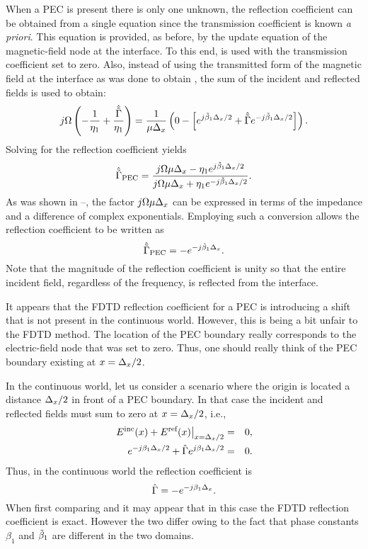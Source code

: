 When a PEC is present there is only one unknown, the reflection
coefficient can be obtained from a single equation since the
transmission coefficient is known {\em a priori}.  This equation is
provided, as before, by the update equation of the magnetic-field node
at the interface.  To this end,  is used with
the transmission coefficient set to zero.  Also, instead of using the
transmitted form of the magnetic field at the interface as was done to
obtain , the sum of the incident and reflected
fields is used to obtain:
\begin{equation}
  j\Omega \left(-\frac{1}{\eta_1}+\frac{\hat{\tilde{\Gamma}}}{\eta_1}\right) =
  \frac{1}{\mu\Delta_x}
     \left(0 - 
           \left[e^{j\tilde{\beta}_1\Delta_x/2} + \hat{\tilde{\Gamma}} e^{-j\tilde{\beta}_1\Delta_x/2}\right]\right).
\end{equation}
Solving for the reflection coefficient yields
\begin{equation}
  \hat{\tilde{\Gamma}}_{\mbox{\scriptsize PEC}} = 
  \frac{j\Omega\mu\Delta_x - \eta_1 e^{j\tilde{\beta}_1\Delta_x/2}}
       {j\Omega\mu\Delta_x + \eta_1 e^{-j\tilde{\beta}_1\Delta_x/2}}.
\end{equation}
As was shown in
--, the factor
$j\Omega\mu\Delta_x$ can be expressed in terms of the impedance and a
difference of complex exponentials.  Employing such a conversion
allows the reflection coefficient to be written as
\begin{equation}
  \hat{\tilde{\Gamma}}_{\mbox{\scriptsize PEC}} = -e^{-j\tilde{\beta}_1\Delta_x}.
  \label{eq:fdtdRefPEC}
\end{equation}
Note that the magnitude of the reflection coefficient is unity so that
the entire incident field, regardless of the frequency, is reflected from
the interface.

It appears that the FDTD reflection coefficient for a PEC is
introducing a shift that is not present in the continuous world.
However, this is being a bit unfair to the FDTD method.  The location
of the PEC boundary really corresponds to the electric-field node
that was set to zero.  Thus, one should really think of the PEC
boundary existing at $x=\Delta_x/2$.

In the continuous world, let us consider a scenario where the origin
is located a distance $\Delta_x/2$ in front of a PEC boundary.  In that
case the incident and reflected fields must sum to zero at
$x=\Delta_x/2$, i.e.,
\begin{eqnarray}
  \left.E^{\mbox{\scriptsize inc}}(x) + E^{\mbox{\scriptsize ref}}(x)
  \right|_{x=\Delta_x/2} &=& 0,\\
  e^{-j\beta_1\Delta_x/2} + \hat{\Gamma} e^{j\beta_1\Delta_x/2}  &=& 0.
\end{eqnarray}
Thus, in the continuous world the reflection coefficient is
\begin{equation}
 \hat{\Gamma} = -e^{-j\beta_1\Delta_x}.
 \label{eq:refContinuousPEC}
\end{equation}
When first comparing 
and  it may appear that in this case the
FDTD reflection coefficient is exact.  However the two differ owing to
the fact that phase constants $\beta_1$ and $\tilde{\beta}_1$ are different
in the two domains.

